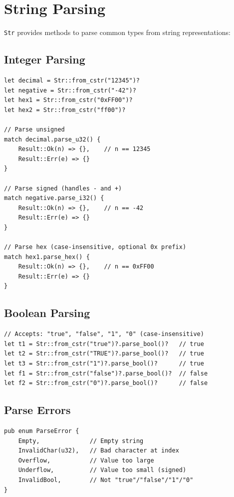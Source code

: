 \section{String Parsing}
\label{sec:string-parsing}

\texttt{Str} provides methods to parse common types from string representations:

\subsection{Integer Parsing}

\begin{lstlisting}
let decimal = Str::from_cstr("12345")?
let negative = Str::from_cstr("-42")?
let hex1 = Str::from_cstr("0xFF00")?
let hex2 = Str::from_cstr("ff00")?

// Parse unsigned
match decimal.parse_u32() {
    Result::Ok(n) => {},    // n == 12345
    Result::Err(e) => {}
}

// Parse signed (handles - and +)
match negative.parse_i32() {
    Result::Ok(n) => {},    // n == -42
    Result::Err(e) => {}
}

// Parse hex (case-insensitive, optional 0x prefix)
match hex1.parse_hex() {
    Result::Ok(n) => {},    // n == 0xFF00
    Result::Err(e) => {}
}
\end{lstlisting}

\subsection{Boolean Parsing}

\begin{lstlisting}
// Accepts: "true", "false", "1", "0" (case-insensitive)
let t1 = Str::from_cstr("true")?.parse_bool()?   // true
let t2 = Str::from_cstr("TRUE")?.parse_bool()?   // true
let t3 = Str::from_cstr("1")?.parse_bool()?      // true
let f1 = Str::from_cstr("false")?.parse_bool()?  // false
let f2 = Str::from_cstr("0")?.parse_bool()?      // false
\end{lstlisting}

\subsection{Parse Errors}

\begin{lstlisting}
pub enum ParseError {
    Empty,              // Empty string
    InvalidChar(u32),   // Bad character at index
    Overflow,           // Value too large
    Underflow,          // Value too small (signed)
    InvalidBool,        // Not "true"/"false"/"1"/"0"
}
\end{lstlisting}

